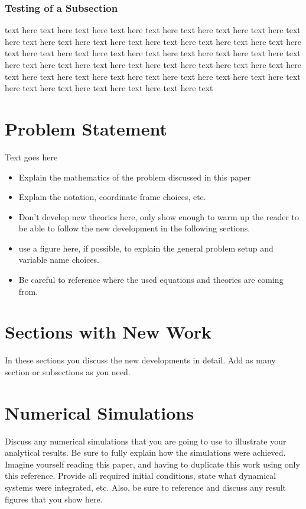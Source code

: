 \documentclass[paper]{aiaaNew}
\begin{document}
 \subsubsection{Testing of a Subsection}

text here text here text here text here text here text here text here text here text here text here text here text here text here text here text here text here text here text here text here text here text here text here text here text here text here text here text here text here text here text here text here text here text here text here text here text here text here text here text here text here text here text here text here text here text here text here text here text here text 




\section{Problem Statement}
Text goes here
\begin{itemize}
	\item Explain the mathematics of the problem discussed in this paper
	\item Explain the notation, coordinate frame choices, etc.
	\item Don't develop new theories here, only show enough to warm up the reader to be able to follow the new development in the following sections.  
	\item use a figure here, if possible, to explain the general problem setup and variable name choices.  
	\item Be careful to reference where the used equations and theories are coming from.  
\end{itemize}


\section{Sections with New Work}
In these sections you discuss the new developments in detail.  Add as many section or subsections as you need.  


\section{Numerical Simulations}
Discuss any numerical simulations that you are going to use to illustrate your analytical results.  Be sure to fully explain how the simulations were achieved.  Imagine yourself reading this paper, and having to duplicate this work using only this reference.  Provide all required initial conditions, state what dynamical systems were integrated, etc.  Also, be sure to reference and discuss any result figures that you show here.
\end{document}
